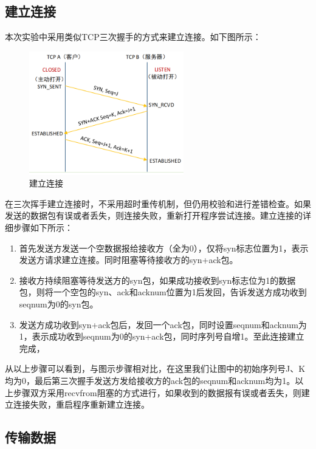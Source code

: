\documentclass[UTF8,a4paper,10pt]{ctexart}
\begin{document}
\subsection{建立连接}
本次实验中采用类似TCP三次握手的方式来建立连接。如下图所示：
\begin{figure}[H]
    \centering
\includegraphics[width=0.6\textwidth]{img/建立连接.png}
    \caption{建立连接}
\end{figure}
在三次挥手建立连接时，不采用超时重传机制，但仍用校验和进行差错检查。如果发送的数据包有误或者丢失，则连接失败，重新打开程序尝试连接。建立连接的详细步骤如下所示：
\begin{enumerate}
    \item 首先发送方发送一个空数据报给接收方（全为0），仅将syn标志位置为1，表示发送方请求建立连接。同时阻塞等待接收方的syn+ack包。
    \item 接收方持续阻塞等待发送方的syn包，如果成功接收到syn标志位为1的数据包，则将一个空包的syn、ack和acknum位置为1后发回，告诉发送方成功收到seqnum为0的syn包。
    \item 发送方成功收到syn+ack包后，发回一个ack包，同时设置seqnum和acknum为1，表示成功收到seqnum为0的syn+ack包，同时序列号自增1。至此连接建立完成，
\end{enumerate}\par
从以上步骤可以看到，与图示步骤相对比，在这里我们让图中的初始序列号J、K均为0，最后第三次握手发送方发给接收方的ack包的seqnum和acknum均为1。以上步骤双方采用recvfrom阻塞的方式进行，如果收到的数据报有误或者丢失，则建立连接失败，重启程序重新建立连接。

\subsection{传输数据}
\end{document}
